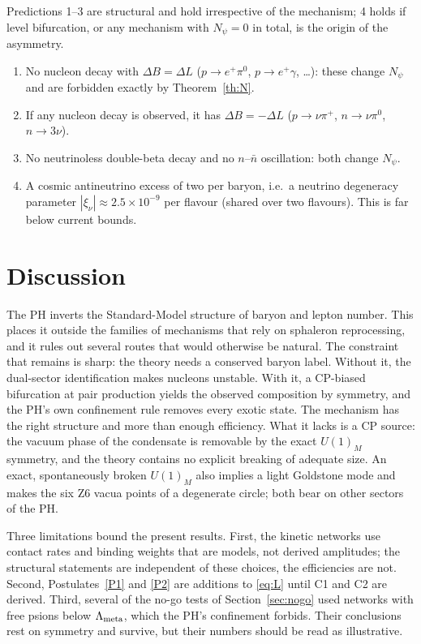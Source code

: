 \documentclass[11pt]{article}
\newcommand{\Lm}{\Lambda_{\rm meta}}
\newcommand{\Np}{N_\psi}
\begin{document}
Predictions 1--3 are structural and hold irrespective of the mechanism; 4 holds if level bifurcation, or any mechanism with $\Np=0$ in total, is the origin of the asymmetry.
\begin{enumerate}
\item No nucleon decay with $\Delta B=\Delta L$ ($p\to e^+\pi^0$, $p\to e^+\gamma$, \dots): these change $\Np$ and are forbidden exactly by Theorem~\ref{th:N}.
\item If any nucleon decay is observed, it has $\Delta B=-\Delta L$ ($p\to\nu\pi^+$, $n\to\nu\pi^0$, $n\to3\nu$).
\item No neutrinoless double-beta decay and no $n$--$\bar n$ oscillation: both change $\Np$.
\item A cosmic antineutrino excess of two per baryon, i.e.\ a neutrino degeneracy parameter $|\xi_\nu|\approx2.5\times10^{-9}$ per flavour (shared over two flavours). This is far below current bounds.
\end{enumerate}

\section{Discussion}

The PH inverts the Standard-Model structure of baryon and lepton number. This places it outside the families of mechanisms that rely on sphaleron reprocessing, and it rules out several routes that would otherwise be natural. The constraint that remains is sharp: the theory needs a conserved baryon label. Without it, the dual-sector identification makes nucleons unstable. With it, a CP-biased bifurcation at pair production yields the observed composition by symmetry, and the PH's own confinement rule removes every exotic state. The mechanism has the right structure and more than enough efficiency. What it lacks is a CP source: the vacuum phase of the condensate is removable by the exact $U(1)_M$ symmetry, and the theory contains no explicit breaking of adequate size. An exact, spontaneously broken $U(1)_M$ also implies a light Goldstone mode and makes the six Z6 vacua points of a degenerate circle; both bear on other sectors of the PH.

Three limitations bound the present results. First, the kinetic networks use contact rates and binding weights that are models, not derived amplitudes; the structural statements are independent of these choices, the efficiencies are not. Second, Postulates~\ref{P1} and \ref{P2} are additions to \eqref{eq:L} until C1 and C2 are derived. Third, several of the no-go tests of Section~\ref{sec:nogo} used networks with free psions below $\Lm$, which the PH's confinement forbids. Their conclusions rest on symmetry and survive, but their numbers should be read as illustrative.
\end{document}
